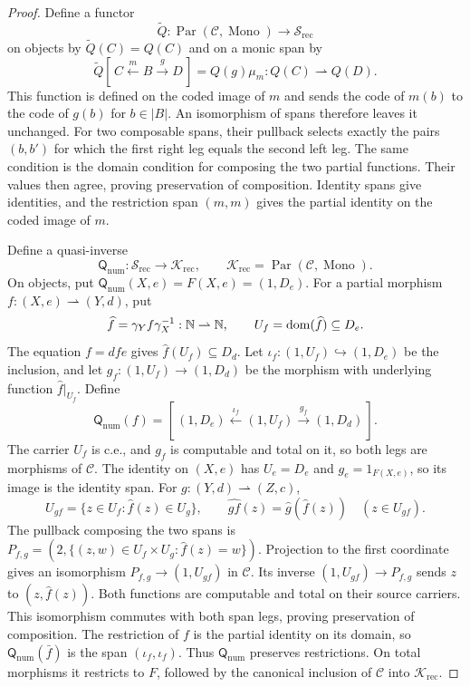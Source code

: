 \begin{proof}
Define a functor
\[
 \widetilde Q:\operatorname{Par}(\mathcal C,\operatorname{Mono})
                 \longrightarrow\mathscr S_{\mathrm{rec}}
\]
on objects by $\widetilde Q(C)=Q(C)$ and on a monic span by
\[
 \widetilde Q[\,C\xleftarrow{m}B\xrightarrow{g}D\,]
       =Q(g)\mu_m:Q(C)\rightharpoonup Q(D).
\]
This function is defined on the coded image of $m$ and sends
the code of $m(b)$ to the code of $g(b)$ for $b\in|B|$. An isomorphism of spans therefore leaves it
unchanged. For two composable spans, their pullback selects exactly
the pairs $(b,b')$ for which the first right leg equals the second
left leg. The same condition is the domain condition for composing
the two partial functions. Their values then agree, proving
preservation of composition. Identity spans give identities, and
the restriction span $(m,m)$ gives the partial identity on the coded image of $m$.

Define a quasi-inverse
\[
 \mathsf Q_{\mathrm{num}}:\mathscr S_{\mathrm{rec}}
       \longrightarrow\mathcal K_{\mathrm{rec}},
 \qquad
 \mathcal K_{\mathrm{rec}}
       =\operatorname{Par}(\mathcal C,\operatorname{Mono}).
\]
On objects, put $\mathsf Q_{\mathrm{num}}(X,e)=F(X,e)=(1,D_e)$.
For a partial morphism $f:(X,e)\rightharpoonup(Y,d)$, put
\[
 \widehat f=\gamma_Y f\gamma_X^{-1}:\mathbb N\rightharpoonup\mathbb N,
 \qquad U_f=\operatorname{dom}(\widehat f)\subseteq D_e.
\]
The equation $f=dfe$ gives $\widehat f(U_f)\subseteq D_d$.
Let $\iota_f:(1,U_f)\hookrightarrow(1,D_e)$ be the inclusion,
and let $g_f:(1,U_f)\to(1,D_d)$ be the morphism with underlying
function $\widehat f|_{U_f}$. Define
\[
 \mathsf Q_{\mathrm{num}}(f)=
 [\,(1,D_e)\xleftarrow{\iota_f}(1,U_f)
                      \xrightarrow{g_f}(1,D_d)\,].
\]
The carrier $U_f$ is c.e., and $g_f$ is computable and total on it,
so both legs are morphisms of $\mathcal C$.
The identity on $(X,e)$ has $U_e=D_e$ and $g_e=1_{F(X,e)}$,
so its image is the identity span.
For $g:(Y,d)\rightharpoonup(Z,c)$,
\[
 U_{gf}=\{z\in U_f:\widehat f(z)\in U_g\},\qquad
 \widehat{gf}(z)=\widehat g(\widehat f(z))\quad(z\in U_{gf}).
\]
The pullback composing the two spans is
$P_{f,g}=(2,\{(z,w)\in U_f\times U_g:\widehat f(z)=w\})$.
Projection to the first coordinate gives an isomorphism
$P_{f,g}\to(1,U_{gf})$ in $\mathcal C$. Its inverse
$(1,U_{gf})\to P_{f,g}$ sends $z$ to $(z,\widehat f(z))$.
Both functions are computable and total on their source carriers.
This isomorphism commutes with both span legs, proving
preservation of composition.
The restriction of $f$ is the partial identity on its domain,
so $\mathsf Q_{\mathrm{num}}(\bar f)$ is the span
$(\iota_f,\iota_f)$. Thus $\mathsf Q_{\mathrm{num}}$ preserves
restrictions. On total morphisms it restricts to $F$, followed by
the canonical inclusion of $\mathcal C$ into $\mathcal K_{\mathrm{rec}}$.


\end{proof}

